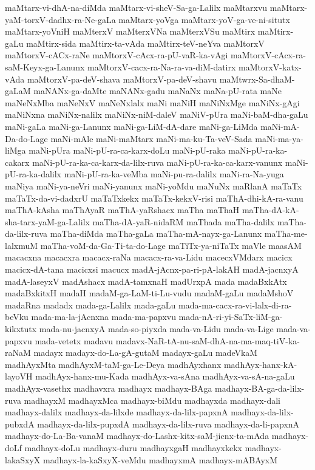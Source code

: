 {maMtarx-vi-dhA-na-diMda
maMtarx-vi-sheV-Sa-ga-Lalilx
maMtarxvu
maMtarx-yaM-torxV-dadhx-ra-Ne-gaLa
maMtarx-yoVga
maMtarx-yoV-ga-ve-ni-situtx
maMtarx-yoVniH
maMterxV
maMterxVNa
maMterxVSu
maMtirx
maMtirx-gaLu
maMtirx-sida
maMtirx-ta-vAda
maMtirx-teV-neYva
maMtorxV
maMtorxV-cACx-raNe
maMtorxV-cAcx-ra-pU-vaR-ka-vAgi
maMtorxV-cAcx-ra-saM-Keyx-ga-Lanunx
maMtorxV-cacx-ra-Na-ra-va-diM-datirx
maMtorxV-katx-vAda
maMtorxV-pa-deV-shava
maMtorxV-pa-deV-shavu
maMtwrx-Sa-dhaM-gaLaM
maNANx-ga-daMte
maNANx-gadu
maNaNx
maNa-pU-rata
maNe
maNeNxMba
maNeNxV
maNeNxlalx
maNi
maNiH
maNiNxMge
maNiNx-gAgi
maNiNxna
maNiNx-nalilx
maNiNx-niM-daleV
maNiV-pUra
maNi-baM-dha-gaLu
maNi-gaLa
maNi-ga-Lanunx
maNi-ga-LiM-dA-dare
maNi-ga-LiMda
maNi-mA-Da-do-Lage
maNi-mAle
maNi-maMtarx
maNi-ma-ku-Ta-veV-Sada
maNi-ma-ya-liMga
maNi-pUra
maNi-pU-ra-ca-karx-doLu
maNi-pU-raka
maNi-pU-ra-ka-cakarx
maNi-pU-ra-ka-ca-karx-da-lilx-ruva
maNi-pU-ra-ka-ca-karx-vanunx
maNi-pU-ra-ka-dalilx
maNi-pU-ra-ka-veMba
maNi-pu-ra-dalilx
maNi-ra-Na-yuga
maNiya
maNi-ya-neVri
maNi-yanunx
maNi-yoMdu
maNuNx
maRlanA
maTaTx
maTaTx-da-vi-dadxrU
maTaTxkekx
maTaTx-kekxV-risi
maThA-dhi-kA-ra-vanu
maThA-kAsha
maThAyaR
maThA-yaRshacx
maTha
maThaH
maTha-dA-kA-sha-tarx-yaM-ga-Lalilx
maTha-dA-yaR-nidaRM
maThada
maTha-dalilx
maTha-da-lilx-ruva
maTha-diMda
maTha-gaLa
maTha-mA-nayx-ga-Lanunx
maTha-me-lalxmuM
maTha-voM-da-Ga-Ti-ta-do-Lage
maTiTx-ya-niTaTx
maVle
maasAM
macacxna
macacxra
macacx-raNa
macacx-ra-va-Lidu
macecxVMdarx
macicx
macicx-dA-tana
macicxsi
macucx
madA-jAcnx-pa-ri-pA-lakAH
madA-jacnxyA
madA-laseyxV
madAshacx
madA-tamxnaH
madUrxpA
mada
madaBxkAtx
madaBxkitxH
madaH
madaM-ga-LaM-ti-Lu-vudu
madaM-gaLu
madaMshoV
madaRna
madadx
mada-ga-Lalilx
mada-gaLu
mada-ma-cacx-ra-vi-lalx-di-ra-beVku
mada-ma-la-jAcnxna
mada-ma-papxvu
mada-nA-ri-yi-SaTx-liM-ga-kikxtutx
mada-nu-jacnxyA
mada-so-piyxda
mada-va-Lidu
mada-va-Lige
mada-va-papxvu
mada-vetetx
madavu
madavx-NaR-tA-nu-saM-dhA-na-ma-maq-tiV-ka-raNaM
madayx
madayx-do-La-gA-gutaM
madayx-gaLu
madeVkaM
madhAyxMta
madhAyxM-taM-ga-Le-Deya
madhAyxhanx
madhAyx-hanx-kA-layoVH
madhAyx-hanx-mu-Kada
madhAyx-va-sAna
madhAyx-va-sA-na-gaLu
madhAyx-vasethx
madhavxra
madhayx
madhayx-BAga
madhayx-BA-ga-da-lilx-ruva
madhayxM
madhayxMca
madhayx-biMdu
madhayxda
madhayx-dali
madhayx-dalilx
madhayx-da-lilxde
madhayx-da-lilx-papxnA
madhayx-da-lilx-pubxdA
madhayx-da-lilx-pupxdA
madhayx-da-lilx-ruva
madhayx-da-li-papxnA
madhayx-do-La-Ba-vanaM
madhayx-do-Lashx-kitx-saM-jicnx-ta-mAda
madhayx-doLf
madhayx-doLu
madhayx-duru
madhayxgaH
madhayxkekx
madhayx-lakaSxyX
madhayx-la-kaSxyX-veMdu
madhayxmA
madhayx-mABAyxM
}
